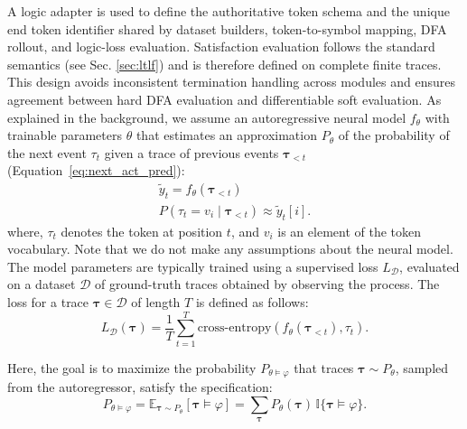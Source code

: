 A logic adapter is used to define the authoritative token schema and the unique end token identifier shared by dataset builders, token-to-symbol mapping, DFA rollout, and logic-loss evaluation. 
Satisfaction evaluation follows the standard \ltlf semantics (see Sec. \ref{sec:ltlf}) and is therefore defined on complete finite traces. This design avoids inconsistent termination handling across modules and ensures agreement between hard DFA evaluation and differentiable soft evaluation.
%
As explained in the background, we assume an autoregressive neural model $f_\theta$ with trainable parameters $\theta$ that estimates an approximation $P_\theta$ of the probability of the next event $\tau_t$ given a trace of previous events $\boldsymbol{\tau}_{<t}$ (Equation~\ref{eq:next_act_pred}):
\begin{equation} 
\label{eq:RNN}
\begin{array}{ll}
     \tilde{y}_t = f_\theta(\boldsymbol{\tau}_{<t}) \\
     P(\tau_{t} = v_i \mid \boldsymbol{\tau}_{<t}) \approx \tilde{y}_t[i].
\end{array}
\end{equation}
where, $\tau_{t}$ denotes the token at position $t$, and $v_i$ is an element of the token vocabulary. Note that we do not make any assumptions about the neural model. The model parameters are typically trained using a supervised loss $L_{\mathcal{D}}$, evaluated on a dataset $\mathcal{D}$ of ground-truth traces obtained by observing the process. The loss for a trace $\boldsymbol{\tau} \in \mathcal{D}$ of length $T$ is defined as follows:
\begin{equation} \label{eq:sup_loss}
    L_{\mathcal{D}}(\boldsymbol{\tau}) = \frac{1}{T} \sum_{t=1}^T \text{cross-entropy}(f_\theta(\boldsymbol{\tau}_{<t}), \tau_{t}) .
\end{equation}

Here, the goal is 
%
to maximize the probability $P_{\theta \vDash \varphi}$ that traces $\boldsymbol{\tau} \sim P_\theta$, sampled from the autoregressor, satisfy the specification:
\begin{equation} \label{eq:logic_prob}
P_{\theta \vDash \varphi} = \mathbb{E}_{\boldsymbol{\tau} \sim P_\theta}[\boldsymbol{\tau} \vDash \varphi] = 
\sum_{\boldsymbol{\tau}} P_\theta(\boldsymbol{\tau}) \, \mathbb{I}\{\boldsymbol{\tau} \vDash \varphi\}.
\end{equation}


